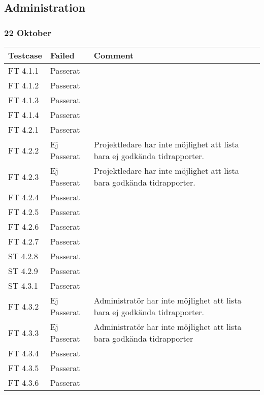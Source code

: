 \documentclass[a4paper]{article}
\begin{document}







\subsection{Administration}

\subsubsection{22 Oktober}
\begin{tabular}{| l | l | p{11cm} |}
\hline
Testcase &  Failed & Comment\\
\hline
FT 4.1.1 & Passerat & \\
\hline
FT 4.1.2 & Passerat & \\
\hline
FT 4.1.3 & Passerat & \\
\hline
FT 4.1.4 & Passerat & \\
\hline
FT 4.2.1 & Passerat & \\
\hline
FT 4.2.2 & Ej Passerat & Projektledare har inte möjlighet att lista bara ej godkända tidrapporter.\\
\hline
FT 4.2.3 & Ej Passerat & Projektledare har inte möjlighet att lista bara godkända tidrapporter.\\
\hline
FT 4.2.4 & Passerat & \\
\hline
FT 4.2.5 & Passerat & \\
\hline
FT 4.2.6 & Passerat & \\
\hline
FT 4.2.7 & Passerat & \\
\hline
ST 4.2.8 & Passerat & \\
\hline
ST 4.2.9 & Passerat & \\
\hline
ST 4.3.1 & Passerat & \\
\hline
FT 4.3.2 & Ej Passerat & Administratör har inte möjlighet att lista bara ej godkända tidrapporter. \\
\hline
FT 4.3.3 & Ej Passerat & Administratör har inte möjlighet att lista bara godkända tidrapporter\\
\hline
FT 4.3.4 & Passerat & \\
\hline
FT 4.3.5 & Passerat & \\
\hline
FT 4.3.6 & Passerat & \\

\end{tabular}
\end{document}
